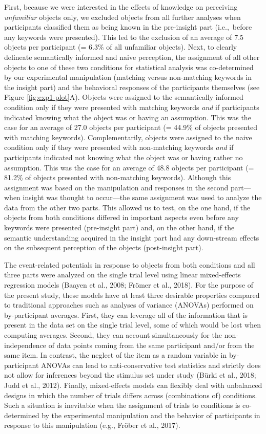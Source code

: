 \documentclass[
  english,
  doc,12pt,twoside,floatsintext]{apa7}
\begin{document}
First, because we were interested in the effects of knowledge on perceiving \emph{unfamiliar} objects only, we excluded objects from all further analyses when participants classified them as being known in the pre-insight part (i.e.,~before any keywords were presented). This led to the exclusion of an average of 7.5 objects per participant (= 6.3\% of all unfamiliar objects). Next, to clearly delineate semantically informed and naive perception, the assignment of all other objects to one of these two conditions for statistical analysis was co-determined by our experimental manipulation (matching versus non-matching keywords in the insight part) and the behavioral responses of the participants themselves (see Figure \ref{fig:exp1-plot}A). Objects were assigned to the semantically informed condition only if they were presented with matching keywords \emph{and} if participants indicated knowing what the object was or having an assumption. This was the case for an average of 27.0 objects per participant (= 44.9\% of objects presented with matching keywords). Complementarily, objects were assigned to the naive condition only if they were presented with non-matching keywords \emph{and} if participants indicated not knowing what the object was or having rather no assumption. This was the case for an average of 48.8 objects per participant (= 81.2\% of objects presented with non-matching keywords). Although this assignment was based on the manipulation and responses in the second part---when insight was thought to occur---the same assignment was used to analyze the data from the other two parts. This allowed us to test, on the one hand, if the objects from both conditions differed in important aspects even before any keywords were presented (pre-insight part) and, on the other hand, if the semantic understanding acquired in the insight part had any down-stream effects on the subsequent perception of the objects (post-insight part).

The event-related potentials in response to objects from both conditions and all three parts were analyzed on the single trial level using linear mixed-effects regression models (Baayen et al., 2008; Frömer et al., 2018). For the purpose of the present study, these models have at least three desirable properties compared to traditional approaches such as analyses of variance (ANOVAs) performed on by-participant averages. First, they can leverage all of the information that is present in the data set on the single trial level, some of which would be lost when computing averages. Second, they can account simultaneously for the non-independence of data points coming from the same participant and/or from the same item. In contrast, the neglect of the item as a random variable in by-participant ANOVAs can lead to anti-conservative test statistics and strictly does not allow for inferences beyond the stimulus set under study (Bürki et al., 2018; Judd et al., 2012). Finally, mixed-effects models can flexibly deal with unbalanced designs in which the number of trials differs across (combinations of) conditions. Such a situation is inevitable when the assignment of trials to conditions is co-determined by the experimental manipulation and the behavior of participants in response to this manipulation (e.g., Fröber et al., 2017).
\end{document}

